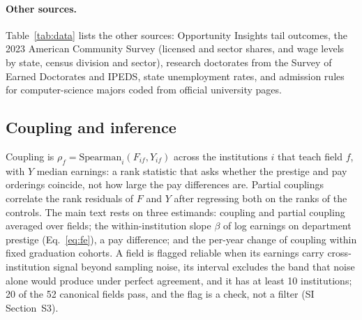 \documentclass[11pt]{article}
\newcommand{\SI}[1]{SI Section~S#1}
\begin{document}
\paragraph{Other sources.} Table~\ref{tab:data} lists the other sources: Opportunity Insights tail outcomes, the
2023 American Community Survey (licensed and sector shares, and wage levels by state, census division and sector),
research doctorates from the Survey of Earned Doctorates and IPEDS, state unemployment rates, and admission rules
for computer-science majors coded from official university pages.

\subsection{Coupling and inference}\label{sec:coupling}

Coupling is $\rho_f=\mathrm{Spearman}_i(F_{if},Y_{if})$ across the institutions $i$ that teach field $f$, with $Y$
median earnings: a rank statistic that asks whether the prestige and pay orderings coincide, not how large the pay
differences are. Partial couplings correlate the rank residuals of $F$ and $Y$ after regressing both on the ranks
of the controls. The main text rests on three estimands: coupling and partial coupling averaged over fields; the
within-institution slope $\beta$ of log earnings on department prestige (Eq.~\ref{eq:fe}), a pay difference; and
the per-year change of coupling within fixed graduation cohorts. A field is flagged reliable when its earnings
carry cross-institution signal beyond sampling noise, its interval excludes the band that noise alone would
produce under perfect agreement, and it has at least 10 institutions; 20 of the 52 canonical fields pass, and the
flag is a check, not a filter (\SI{3}).
\end{document}
